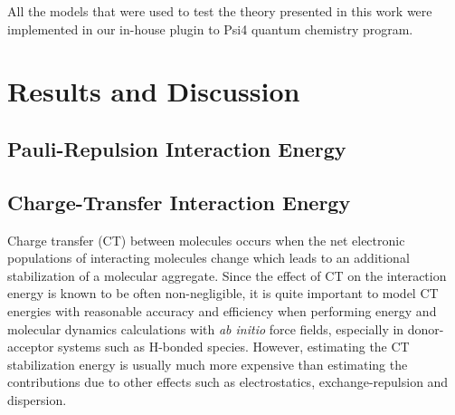 All the models that were used to test the theory presented in this work
were implemented in our in\hyp{}house plugin to {\sc Psi4} quantum chemistry program.\cite{Psi4.JCTC.2017}

\section{\label{s:5}Results and Discussion}
\subsection{\label{ss.5.1}Pauli-Repulsion Interaction Energy}
\subsection{\label{ss.5.2}Charge-Transfer Interaction Energy}

Charge transfer (CT) between molecules occurs when the net electronic populations 
of interacting molecules change which leads to an additional stabilization 
of a molecular aggregate. Since the effect of CT on the interaction energy 
is known to be often non\hyp{}negligible, it is quite important to model 
CT energies with reasonable accuracy and efficiency when performing energy 
and molecular dynamics calculations with \emph{ab initio} force fields, 
especially in donor\hyp{}acceptor systems such as H\hyp{}bonded species. 
However, estimating the CT stabilization energy is usually much more expensive 
than estimating the contributions due to other effects such as electrostatics, 
exchange\hyp{}repulsion and dispersion.\cite{Gordon.Fedorov.Pruitt.Slipchenko.ChemRev.2012}

